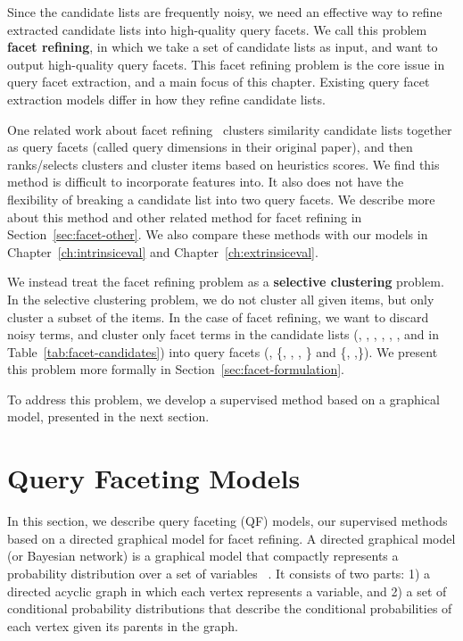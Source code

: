 Since the candidate lists are frequently noisy, we need an effective way to refine extracted candidate lists into high-quality query facets. We call this problem \textbf{facet refining}, in which we take a set of candidate lists as input, and want to output high-quality query facets. This facet refining problem is the core issue in query facet extraction, and a main focus of this chapter. Existing query facet extraction models differ in how they refine candidate lists.

One related work about facet refining~\cite{dou2011finding} clusters similarity candidate lists together as query facets (called query dimensions in their original paper), and then ranks/selects clusters and cluster items based on heuristics scores. We find this method is difficult to incorporate features into. It also does not have the flexibility of breaking a candidate list into two query facets. We describe more about this method and other related method for facet refining in Section~\ref{sec:facet-other}. We also compare these methods with our models in Chapter~\ref{ch:intrinsiceval} and Chapter~\ref{ch:extrinsiceval}.

We instead treat the facet refining problem as a \textbf{selective clustering} problem. In the selective clustering problem, we do not cluster all given items, but only cluster a subset of the items. 
In the case of facet refining, we want to discard noisy terms, and cluster only facet terms in the candidate lists (\eg, , , , , ,  and  in Table~\ref{tab:facet-candidates}) into query facets (\eg, \{, , , \} and \{, ,\}). We present this problem more formally in Section~\ref{sec:facet-formulation}.

To address this problem, we develop a supervised method based on a graphical model, presented in the next section.


\section{Query Faceting Models}
\label{sec:facet-gm}
In this section, we describe query faceting (QF) models, our supervised methods based on a directed graphical model for facet refining. A directed graphical model (or Bayesian network) is a graphical model that compactly represents a probability distribution over a set of variables ~\cite{pearl1988probabilistic}. It consists of two parts: 1) a directed acyclic graph in which each vertex represents a variable, and 2) a set of conditional probability distributions that describe the conditional probabilities of each vertex given its parents in the graph.

